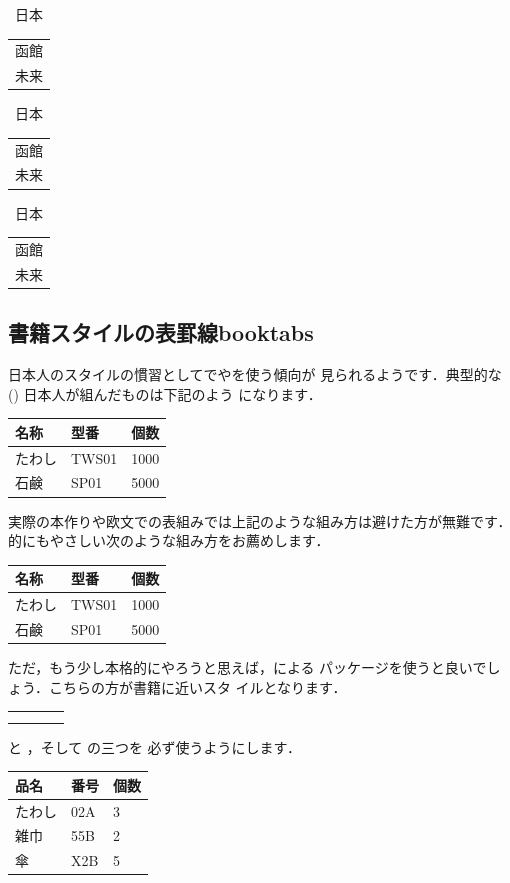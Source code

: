 \begin{InOut}
\newcommand{\testtab}[1][c]{~日本~
\begin{tabular}[#1]{|c|} \hline 
函館\\ 未来\\ \hline\end{tabular}}
\testtab \testtab[t] \testtab[b]
\end{InOut}


\subsection{書籍スタイルの表罫線\zdash\textsf{booktabs}}

日本人のスタイルの慣習としてでやを使う傾向が
見られるようです．典型的な () 日本人が組んだものは下記のよう
になります．
\begin{InOut}
\begin{tabular}{|l||l|l|}
 \hline
 名称   & 型番  & 個数 \\
 \hline\hline
 たわし & TWS01 & 1000 \\ \hline
 石鹸   & SP01  & 5000 \\ \hline
\end{tabular}
\end{InOut}
実際の本作りや欧文での表組みでは上記のような組み方は避けた方が無難です．
的にもやさしい次のような組み方をお薦めします．
\begin{InOut}
\begin{tabular}{lll}
 \hline
 名称   & 型番  & 個数 \\ \hline
 たわし & TWS01 & 1000 \\
 石鹸   & SP01  & 5000 \\ \hline
\end{tabular}
\end{InOut}
ただ，もう少し本格的にやろうと思えば，による
 パッケージを使うと良いでしょう．こちらの方が書籍に近いスタ
イルとなります．
\begin{Syntax}
\begin{tabular}{*4l}
 \C{toprule}    & \pp{表の最上部に引く} &
 \C{midrule}    & \pp{表の中間に引く} \\
 \C{bottomrule} & \pp{表の最下部に引く} &
 \multicolumn{2}{l}{\C{cmidrule}   \pa{罫線を引く範囲}}
\end{tabular}
\end{Syntax}
 と ，そして  の三つを
必ず使うようにします．
\begin{InOut}
\usepackage{booktabs}
\begin{tabular}{lll}
 \toprule
 品名 & 番号 & 個数 \\ \midrule
 たわし & 02A & 3 \\
 雑巾   & 55B & 2 \\
 傘     & X2B & 5 \\ \bottomrule
\end{tabular}
\end{InOut}
